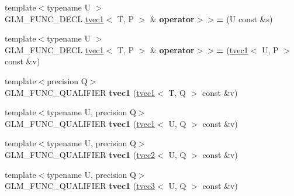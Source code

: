\begin{DoxyCompactItemize}
\item 
\hypertarget{structglm_1_1detail_1_1tvec1_a19aaf3b4350fe2a5c245775e4fa4d80c}{{\footnotesize template$<$typename U $>$ }\\G\-L\-M\-\_\-\-F\-U\-N\-C\-\_\-\-D\-E\-C\-L \hyperlink{structglm_1_1detail_1_1tvec1}{tvec1}$<$ T, P $>$ \& {\bfseries operator$>$$>$=} (U const \&s)}\label{structglm_1_1detail_1_1tvec1_a19aaf3b4350fe2a5c245775e4fa4d80c}

\item 
\hypertarget{structglm_1_1detail_1_1tvec1_a9cbcbbf300a0197e674bc97e277f9683}{{\footnotesize template$<$typename U $>$ }\\G\-L\-M\-\_\-\-F\-U\-N\-C\-\_\-\-D\-E\-C\-L \hyperlink{structglm_1_1detail_1_1tvec1}{tvec1}$<$ T, P $>$ \& {\bfseries operator$>$$>$=} (\hyperlink{structglm_1_1detail_1_1tvec1}{tvec1}$<$ U, P $>$ const \&v)}\label{structglm_1_1detail_1_1tvec1_a9cbcbbf300a0197e674bc97e277f9683}

\item 
\hypertarget{structglm_1_1detail_1_1tvec1_a78ba11094b516ebbb487a9c37714d7c0}{{\footnotesize template$<$precision Q$>$ }\\G\-L\-M\-\_\-\-F\-U\-N\-C\-\_\-\-Q\-U\-A\-L\-I\-F\-I\-E\-R {\bfseries tvec1} (\hyperlink{structglm_1_1detail_1_1tvec1}{tvec1}$<$ T, Q $>$ const \&v)}\label{structglm_1_1detail_1_1tvec1_a78ba11094b516ebbb487a9c37714d7c0}

\item 
\hypertarget{structglm_1_1detail_1_1tvec1_a608940c30970eec33519348c3fedcb6f}{{\footnotesize template$<$typename U, precision Q$>$ }\\G\-L\-M\-\_\-\-F\-U\-N\-C\-\_\-\-Q\-U\-A\-L\-I\-F\-I\-E\-R {\bfseries tvec1} (\hyperlink{structglm_1_1detail_1_1tvec1}{tvec1}$<$ U, Q $>$ const \&v)}\label{structglm_1_1detail_1_1tvec1_a608940c30970eec33519348c3fedcb6f}

\item 
\hypertarget{structglm_1_1detail_1_1tvec1_a83c61bae71b14ac2cba715eee715dea7}{{\footnotesize template$<$typename U, precision Q$>$ }\\G\-L\-M\-\_\-\-F\-U\-N\-C\-\_\-\-Q\-U\-A\-L\-I\-F\-I\-E\-R {\bfseries tvec1} (\hyperlink{structglm_1_1detail_1_1tvec2}{tvec2}$<$ U, Q $>$ const \&v)}\label{structglm_1_1detail_1_1tvec1_a83c61bae71b14ac2cba715eee715dea7}

\item 
\hypertarget{structglm_1_1detail_1_1tvec1_a3c252050abfe0ec01b6ff89566883d8f}{{\footnotesize template$<$typename U, precision Q$>$ }\\G\-L\-M\-\_\-\-F\-U\-N\-C\-\_\-\-Q\-U\-A\-L\-I\-F\-I\-E\-R {\bfseries tvec1} (\hyperlink{structglm_1_1detail_1_1tvec3}{tvec3}$<$ U, Q $>$ const \&v)}\label{structglm_1_1detail_1_1tvec1_a3c252050abfe0ec01b6ff89566883d8f}


\end{DoxyCompactItemize}
